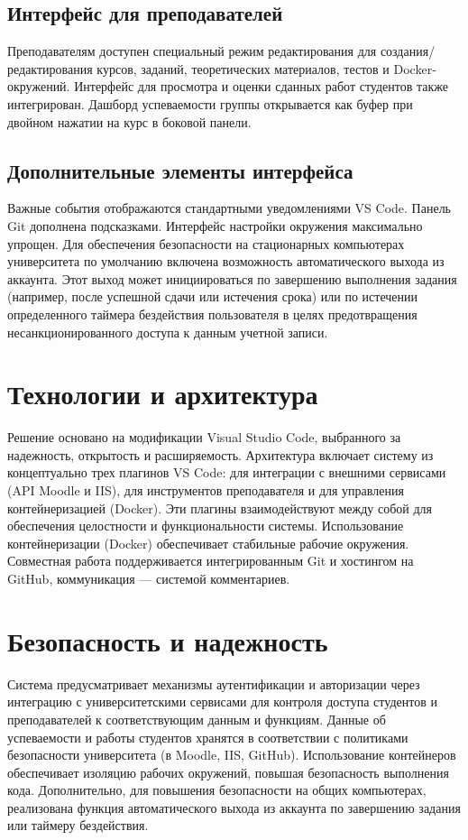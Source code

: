 \documentclass{bsuir}
\begin{document}
\subsection{Интерфейс для преподавателей}

Преподавателям доступен специальный режим редактирования для создания/редактирования
курсов, заданий, теоретических материалов, тестов и Docker-окружений. Интерфейс для
просмотра и оценки сданных работ студентов также интегрирован. Дашборд
успеваемости группы открывается как буфер при двойном нажатии на курс в боковой
панели.

\subsection{Дополнительные элементы интерфейса}

Важные события отображаются стандартными уведомлениями VS Code. Панель Git
дополнена подсказками. Интерфейс настройки окружения максимально упрощен.
Для обеспечения безопасности на стационарных компьютерах университета по умолчанию
включена возможность автоматического выхода из аккаунта. Этот выход может
инициироваться по завершению выполнения задания (например, после успешной сдачи
или истечения срока) или по истечении определенного таймера бездействия
пользователя в целях предотвращения несанкционированного доступа к данным
учетной записи.

\section{Технологии и архитектура}

Решение основано на модификации Visual Studio Code, выбранного за надежность,
открытость и расширяемость. Архитектура включает систему из концептуально
трех плагинов VS Code: для интеграции с внешними сервисами (API Moodle и IIS),
для инструментов преподавателя и для управления контейнеризацией (Docker).
Эти плагины взаимодействуют между собой для обеспечения целостности и
функциональности системы. Использование контейнеризации (Docker) обеспечивает
стабильные рабочие окружения. Совместная работа поддерживается интегрированным
Git и хостингом на GitHub, коммуникация — системой комментариев.

\section{Безопасность и надежность}

Система предусматривает механизмы аутентификации и авторизации через интеграцию
с университетскими сервисами для контроля доступа студентов и преподавателей к
соответствующим данным и функциям. Данные об успеваемости и работы студентов
хранятся в соответствии с политиками безопасности университета (в Moodle, IIS,
GitHub). Использование контейнеров обеспечивает изоляцию рабочих окружений,
повышая безопасность выполнения кода. Дополнительно, для повышения безопасности
на общих компьютерах, реализована функция автоматического выхода из аккаунта
по завершению задания или таймеру бездействия.
\end{document}

